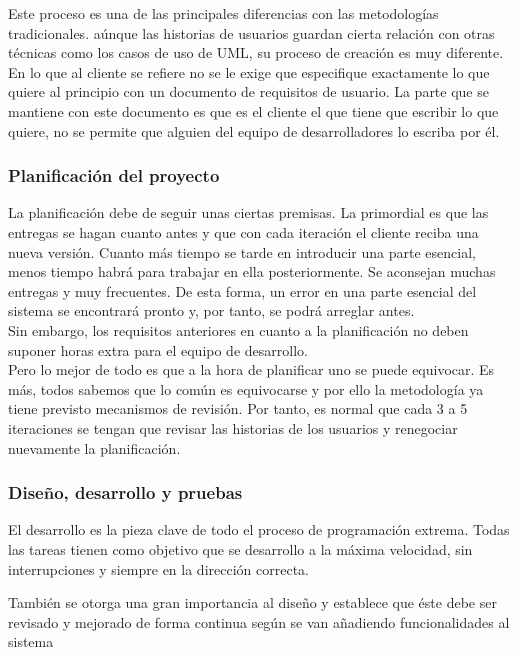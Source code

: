 \documentclass[12pt]{article} %
\begin{document}
			Este proceso es una de las principales diferencias con las metodologías tradicionales. a\'unque las historias de usuarios guardan cierta relación con otras técnicas
			como los casos de uso de UML, su proceso de creación es muy diferente. En lo que al cliente se refiere no se le exige que especifique exactamente lo que quiere al
			principio con un documento de requisitos de usuario. La parte que se mantiene con este documento es que es el cliente el que tiene que escribir lo que quiere, no se
			permite que alguien del equipo de desarrolladores lo escriba por él. 
			
		\subsubsection{Planificación del proyecto}
			 La planificación debe de seguir unas ciertas premisas. La primordial es que las entregas se hagan cuanto antes y que con cada iteración el cliente reciba una nueva
			 versión. Cuanto más tiempo se tarde en introducir una parte esencial, menos tiempo habrá para trabajar en ella posteriormente. Se aconsejan muchas entregas y muy
			 frecuentes. De esta forma, un error en una parte esencial del sistema se encontrará pronto y, por tanto, se podrá arreglar antes.\\
			 
			 Sin embargo, los requisitos anteriores en cuanto a la planificación no deben suponer horas extra para el equipo de desarrollo.\\
			 
			 Pero lo mejor de todo es que a la hora de planificar uno se puede equivocar. Es más, todos sabemos que lo común es equivocarse y por ello la metodología ya tiene
			 previsto mecanismos de revisión. Por tanto, es normal que cada 3 a 5 iteraciones se tengan que revisar las historias de los usuarios y renegociar nuevamente la
			 planificación.\\
		\subsubsection{Diseño, desarrollo y pruebas}
			El desarrollo es la pieza clave de todo el proceso de programación extrema. Todas las tareas tienen como objetivo que se desarrollo a la máxima velocidad, sin
			interrupciones y siempre en la dirección correcta. 
			
			También se otorga una gran importancia al diseño y establece que éste debe ser revisado y mejorado de forma continua según se van añadiendo funcionalidades al sistema
			
\end{document}
